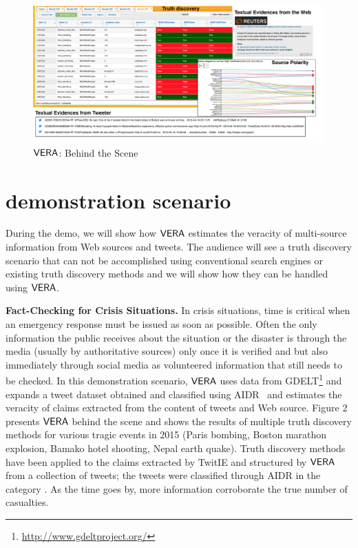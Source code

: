 \begin{figure}[t!]
 \begin{center}
  \includegraphics[width=.95\linewidth]{screenshot2.png}
   \end{center}
\label{screenshot}\caption{$\mathsf{VERA}$: Behind the Scene}
\end{figure}

\section{demonstration scenario}
During the demo, we will show how $\mathsf{VERA}$  estimates the veracity
of multi-source information from  Web sources and tweets.
The audience will see a truth discovery scenario that can
not be accomplished using conventional search engines or existing
truth discovery methods and we will show how they can be handled
using $\mathsf{VERA}$.


\textbf{Fact-Checking for Crisis Situations.}
In crisis situations, time is critical when  an emergency response must be issued as soon as possible. Often the only information the public receives about the situation or the disaster is through the media (usually by authoritative sources) only once it is verified and but also immediately through social media as volunteered information that still needs to be checked. In this demonstration scenario,  $\mathsf{VERA}$ uses data from GDELT\footnote{{\scriptsize\url{http://www.gdeltproject.org/}}} and expands a tweet dataset obtained and classified using AIDR~\cite{AIDR} and estimates the veracity of  claims extracted from the content of tweets and Web source. Figure 2 presents  $\mathsf{VERA}$ behind the scene and shows the results of multiple truth discovery methods for various tragic events in 2015 (Paris bombing, Boston marathon explosion, Bamako hotel shooting, Nepal earth quake). Truth discovery methods have been applied to the claims extracted  by TwitIE and structured by $\mathsf{VERA}$ from a collection of tweets; the tweets were classified through AIDR in the category . As the time goes by, more information corroborate the true number of casualties. %


